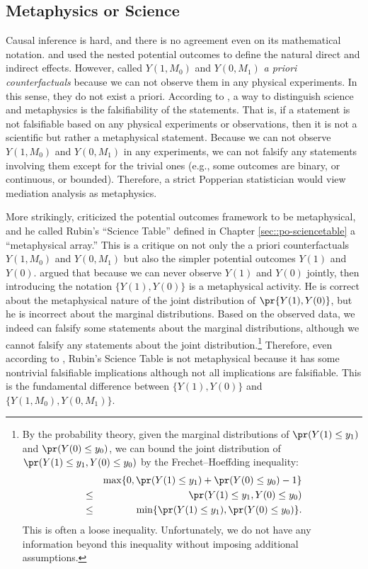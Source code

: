  
\subsection{Metaphysics or Science}
\label{sec::popper-science}

Causal inference is hard, and there is no agreement even on its mathematical notation. \citet{Robins::1992} and \citet{Pearl::2001} used the nested potential outcomes to define the natural direct and indirect effects. However, \citet{frangakis2002principal} called $Y(1,M_0)$ and $Y(0, M_1)$ {\it a priori counterfactuals} because we can not observe them in any physical experiments. In this sense, they do not exist a priori. According to \citet{popper1963conjectures}, a way to distinguish science and metaphysics is the falsifiability of the statements. That is, if a statement is not falsifiable based on any physical experiments or observations, then it is not a scientific but rather a metaphysical statement. Because we can not observe $Y(1,M_0)$ and $Y(0, M_1)$ in any experiments, we can not falsify any statements involving them except for the trivial ones (e.g., some outcomes are binary, or continuous, or bounded). Therefore, a strict Popperian statistician would view mediation analysis as metaphysics. 


More strikingly, \citet{dawid2000causal} criticized the potential outcomes framework to be metaphysical, and he called Rubin's ``Science Table'' defined in Chapter \ref{sec::po-sciencetable} a ``metaphysical array.'' This is a critique on not only the a priori counterfactuals $Y(1,M_0)$ and $Y(0, M_1)$ but also the simpler potential outcomes $Y(1)$ and $Y(0)$.  \citet{dawid2000causal} argued that because we can never observe $Y(1)$ and $Y(0)$ jointly, then introducing the notation $\{ Y(1), Y(0)\}$ is a metaphysical activity. He is correct about the metaphysical nature of the joint distribution of $\pr\{ Y(1) , Y(0) \}$, but he is incorrect about the marginal distributions. Based on the observed data, we indeed can falsify some statements about the marginal distributions, although we cannot falsify any statements about the joint distribution.\footnote{
By the probability theory, given the marginal distributions of $\pr( Y(1) \leq y_1 ) $ and $\pr( Y(0) \leq y_0 ) $, we can bound the joint distribution of $\pr( Y(1) \leq y_1 , Y(0) \leq y_0 ) $ by  the Frechet--Hoeffding inequality:
\begin{eqnarray*}
&&\max\{  0,  \pr( Y(1) \leq y_1) +\pr( Y(0) \leq y_0 ) - 1  \}  \\
&\leq& 
\pr( Y(1) \leq y_1 , Y(0) \leq y_0 ) \\
&\leq& 
\min\{ \pr( Y(1) \leq y_1) , \pr( Y(0) \leq y_0 )  \}.
\end{eqnarray*}
 This is often a loose inequality.  Unfortunately, we do not have any information beyond this inequality without imposing additional assumptions. 
} Therefore, even according to \citet{popper1963conjectures}, Rubin's Science Table is not metaphysical because it has some nontrivial falsifiable implications although not all implications are falsifiable. This is the fundamental difference between $\{ Y(1), Y(0)\}$ and $\{ Y(1,M_0), Y(0, M_1) \} $.
 


